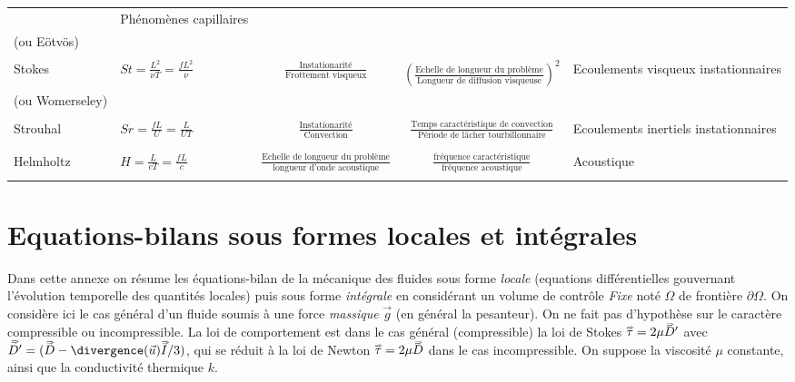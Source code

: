 \begin{landscape}
\begin{tabular}{|l   |l    |c  |c    |l   |}
&
Phénomènes capillaires
\\
(ou E\"otv\"os) &&&&\\
\hline
&&&&\\
Stokes
 & $St =  \frac{L^2}{\nu T } = \frac{f L^2}{\nu }$ & 
$\displaystyle \frac{ \mbox{Instationarité}}{\mbox{Frottement visqueux}}$ 
&
${\left( \displaystyle\frac{ \mbox{Echelle de longueur du problème}}{ \mbox{Longueur de diffusion visqueuse}}  \right)}^2$ 
&
Ecoulements visqueux instationnaires
\\
(ou Womerseley)  &&&&\\
\hline
&&&&\\
Strouhal
 & $Sr  = \frac{f L}{U} =  \frac{L}{U T}$  & 
$\displaystyle\frac{ \mbox{Instationarité}}{ \mbox{Convection}}$ &
$\displaystyle\frac
{ \mbox{Temps caractéristique de convection}}{ \mbox{ Période de lâcher tourbillonnaire }} 
$ 
&
Ecoulements inertiels instationnaires
\\
&&&&\\
\hline
&&&&\\
Helmholtz
 & $H =  \frac{L}{c T} = \frac{f L}{c} $ & 
$\displaystyle\frac{ \mbox{Echelle de longueur du problème}}{ \mbox{longueur d'onde acoustique}}$ &
$\displaystyle\frac{ \mbox{fréquence caractéristique}}{ \mbox{fréquence acoustique}}$ &

Acoustique
\\
&&&&\\
\hline
\end{tabular}

\end{landscape}



\section{Equations-bilans sous formes locales et intégrales}

Dans cette annexe on résume les équations-bilan de la mécanique des fluides sous forme {\em locale } (equations différentielles gouvernant l'évolution temporelle des quantités locales) puis sous forme {\em intégrale } en considérant un volume de contrôle {\em Fixe} noté $\Omega$ de frontière 
$\partial \Omega$.
On considère ici le cas général d'un fluide soumis à une force {\em massique} $\vec g$ (en général la pesanteur). On ne fait pas d'hypothèse sur le caractère compressible ou incompressible. 
La loi de comportement est dans le cas général (compressible) la loi de Stokes $\accentset{\Rightarrow}{\tau} = 2 \mu \accentset{\Rightarrow}{D}'$ avec $ \mytensor{D'} =  ( \mytensor{D} - \divergence ( \vec{u} )\mytensor{I}/3 )$, qui se réduit à la loi de Newton $\accentset{\Rightarrow}{\tau} = 2 \mu \accentset{\Rightarrow}{D}$ dans le cas incompressible. On suppose la viscosité $\mu$ constante, 
ainsi que la conductivité thermique $k$.

